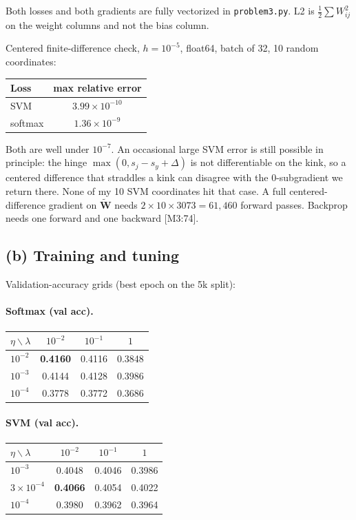 \documentclass[11pt]{article}
\newcommand{\mat}[1]{\mathbf{#1}}
\begin{document}
Both losses and both gradients are fully vectorized in
\texttt{problem3.py}. L2 is \(\frac12\sum W_{ij}^2\) on the weight
columns and not the bias column.

Centered finite-difference check, \(h=10^{-5}\), float64, batch of 32,
10 random coordinates:
\begin{center}
\begin{tabular}{lc}
\toprule
Loss & max relative error \\
\midrule
SVM & \(3.99\times 10^{-10}\) \\
softmax & \(1.36\times 10^{-9}\) \\
\bottomrule
\end{tabular}
\end{center}
Both are well under \(10^{-7}\). An occasional large SVM error is still
possible in principle: the hinge \(\max(0,s_j-s_y+\Delta)\) is not
differentiable on the kink, so a centered difference that straddles a
kink can disagree with the 0-subgradient we return there. None of my
10 SVM coordinates hit that case. A full centered-difference gradient
on \(\widetilde{\mat{W}}\) needs \(2\times 10\times 3073=61{,}460\)
forward passes. Backprop needs one forward and one backward [M3:74].

\subsection*{(b) Training and tuning}

Validation-accuracy grids (best epoch on the 5k split):

\paragraph{Softmax (val acc).}
\begin{center}
\begin{tabular}{lccc}
\toprule
\(\eta \backslash \lambda\) & \(10^{-2}\) & \(10^{-1}\) & \(1\) \\
\midrule
\(10^{-2}\) & \textbf{0.4160} & 0.4116 & 0.3848 \\
\(10^{-3}\) & 0.4144 & 0.4128 & 0.3986 \\
\(10^{-4}\) & 0.3778 & 0.3772 & 0.3686 \\
\bottomrule
\end{tabular}
\end{center}

\paragraph{SVM (val acc).}
\begin{center}
\begin{tabular}{lccc}
\toprule
\(\eta \backslash \lambda\) & \(10^{-2}\) & \(10^{-1}\) & \(1\) \\
\midrule
\(10^{-3}\) & 0.4048 & 0.4046 & 0.3986 \\
\(3\times 10^{-4}\) & \textbf{0.4066} & 0.4054 & 0.4022 \\
\(10^{-4}\) & 0.3980 & 0.3962 & 0.3964 \\
\bottomrule
\end{tabular}
\end{center}
\end{document}
